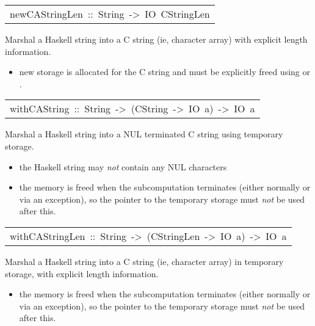 \begin{haddockdesc}
\item[\begin{tabular}{@{}l}
newCAStringLen\ ::\ String\ ->\ IO\ CStringLen
\end{tabular}]\haddockbegindoc
Marshal a Haskell string into a C string (ie, character array) with
 explicit length information.
\par
\begin{itemize}
\item
 new storage is allocated for the C string and must be
   explicitly freed using  or
   .
\par

\end{itemize}

\end{haddockdesc}
\begin{haddockdesc}
\item[\begin{tabular}{@{}l}
withCAString\ ::\ String\ ->\ (CString\ ->\ IO\ a)\ ->\ IO\ a
\end{tabular}]\haddockbegindoc
Marshal a Haskell string into a NUL terminated C string using temporary
 storage.
\par
\begin{itemize}
\item
 the Haskell string may \emph{not} contain any NUL characters
\par

\item
 the memory is freed when the subcomputation terminates (either
   normally or via an exception), so the pointer to the temporary
   storage must \emph{not} be used after this.
\par

\end{itemize}

\end{haddockdesc}
\begin{haddockdesc}
\item[\begin{tabular}{@{}l}
withCAStringLen\ ::\ String\ ->\ (CStringLen\ ->\ IO\ a)\ ->\ IO\ a
\end{tabular}]\haddockbegindoc
Marshal a Haskell string into a C string (ie, character array)
 in temporary storage, with explicit length information.
\par
\begin{itemize}
\item
 the memory is freed when the subcomputation terminates (either
   normally or via an exception), so the pointer to the temporary
   storage must \emph{not} be used after this.
\par

\end{itemize}

\end{haddockdesc}
